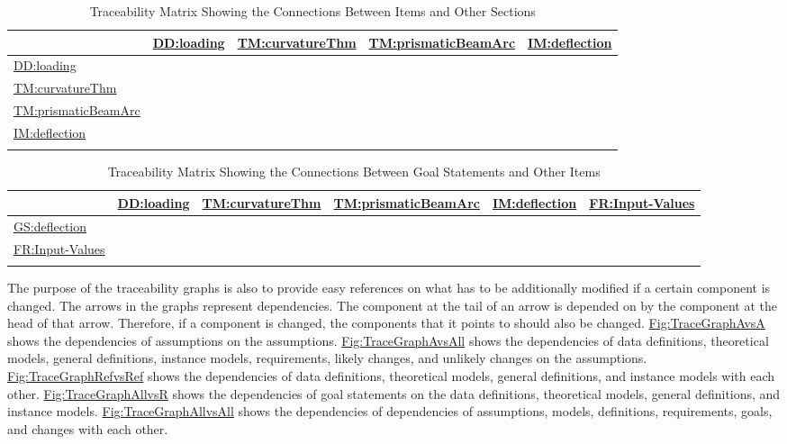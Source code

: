 \documentclass[12pt]{article}
\begin{document}
\begin{longtable}{l l l l l}
\toprule
\textbf{} & \textbf{\hyperref[DD:loading]{DD:loading}} & \textbf{\hyperref[TM:curvatureThm]{TM:curvatureThm}} & \textbf{\hyperref[TM:prismaticBeamArc]{TM:prismaticBeamArc}} & \textbf{\hyperref[IM:deflection]{IM:deflection}}
\\
\midrule
\endhead
\hyperref[DD:loading]{DD:loading} &  &  &  & 
\\
\hyperref[TM:curvatureThm]{TM:curvatureThm} &  &  &  & 
\\
\hyperref[TM:prismaticBeamArc]{TM:prismaticBeamArc} &  &  &  & 
\\
\hyperref[IM:deflection]{IM:deflection} &  &  &  & 
\\
\bottomrule
\caption{Traceability Matrix Showing the Connections Between Items and Other Sections}
\label{Table:TraceMatRefvsRef}
\end{longtable}
\begin{longtable}{l l l l l l}
\toprule
\textbf{} & \textbf{\hyperref[DD:loading]{DD:loading}} & \textbf{\hyperref[TM:curvatureThm]{TM:curvatureThm}} & \textbf{\hyperref[TM:prismaticBeamArc]{TM:prismaticBeamArc}} & \textbf{\hyperref[IM:deflection]{IM:deflection}} & \textbf{\hyperref[inputValues]{FR:Input-Values}}
\\
\midrule
\endhead
\hyperref[deflection]{GS:deflection} &  &  &  &  & 
\\
\hyperref[inputValues]{FR:Input-Values} &  &  &  &  & 
\\
\bottomrule
\caption{Traceability Matrix Showing the Connections Between Goal Statements and Other Items}
\label{Table:TraceMatAllvsR}
\end{longtable}
The purpose of the traceability graphs is also to provide easy references on what has to be additionally modified if a certain component is changed. The arrows in the graphs represent dependencies. The component at the tail of an arrow is depended on by the component at the head of that arrow. Therefore, if a component is changed, the components that it points to should also be changed. \hyperref[Figure:TraceGraphAvsA]{Fig:TraceGraphAvsA} shows the dependencies of assumptions on the assumptions. \hyperref[Figure:TraceGraphAvsAll]{Fig:TraceGraphAvsAll} shows the dependencies of data definitions, theoretical models, general definitions, instance models, requirements, likely changes, and unlikely changes on the assumptions. \hyperref[Figure:TraceGraphRefvsRef]{Fig:TraceGraphRefvsRef} shows the dependencies of data definitions, theoretical models, general definitions, and instance models with each other. \hyperref[Figure:TraceGraphAllvsR]{Fig:TraceGraphAllvsR} shows the dependencies of goal statements on the data definitions, theoretical models, general definitions, and instance models. \hyperref[Figure:TraceGraphAllvsAll]{Fig:TraceGraphAllvsAll} shows the dependencies of dependencies of assumptions, models, definitions, requirements, goals, and changes with each other.
\end{document}
